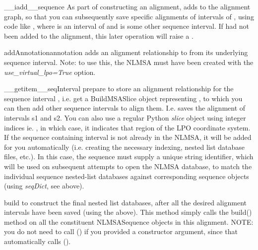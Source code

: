 \documentclass{howto}
\begin{document}
\begin{funcdesc}{__iadd__}{sequence}
  As part of constructing an alignment, adds  to the alignment graph,
  so that you can subsequently save specific alignments of intervals of
  , using code like , where  is
  an interval of  and  is some other sequence interval.
  If  had not been added to the alignment, this later operation
  will raise a .
\end{funcdesc}

\begin{funcdesc}{addAnnotation}{annotation}
  adds an alignment relationship to  from its underlying
  sequence interval.  Note: to use this, the NLMSA must have been created with the
  {\em use_virtual_lpo=True} option.
\end{funcdesc}

\begin{funcdesc}{__getitem__}{seqInterval}
  prepare to store an alignment relationship for the sequence interval ,
  i.e. get a BuildMSASlice object representing , to which you can
  then add other sequence intervals to align them.  I.e. 
  saves the alignment of intervals s1 and s2.
  You can also use a regular Python {\em slice} object using integer indices
  ie. , in which case, it indicates that 
  region of the LPO coordinate system.
  If the sequence containing
  interval  is not already in the NLMSA, it will be added for you automatically
  (i.e. creating the necessary indexing, nested list database files, etc.).  In this
  case, the sequence must supply a unique string identifier, which will be used
  on subsequent attempts to open the NLMSA database, to match the individual sequence
  nested-list databases against corresponding sequence objects (using {\em seqDict},
  see above).
\end{funcdesc}


\begin{funcdesc}{build}{}
  to construct the final nested list databases,
  after all the desired alignment intervals have been saved (using the
   above).  This method
  simply calls the build() method on all the constituent NLMSASequence objects
  in this alignment.  NOTE: you do not need to call () if
  you provided a  constructor argument, since that automatically
  calls ().
\end{funcdesc}
\end{document}
